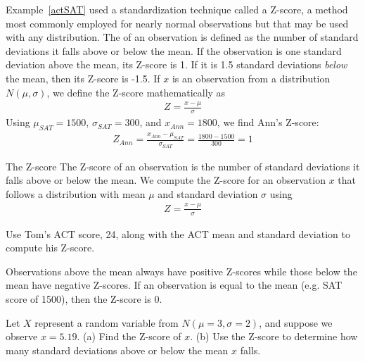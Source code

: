 Example~\ref{actSAT} used a standardization technique called a Z-score, a method most commonly employed for nearly normal observations but that may be used with any distribution. The  of an observation is defined as the number of standard deviations it falls above or below the mean. If the observation is one standard deviation above the mean, its Z-score is 1. If it is 1.5 standard deviations \emph{below} the mean, then its Z-score is -1.5. If $x$ is an observation from a distribution $N(\mu, \sigma)$, we define the Z-score mathematically as
\begin{eqnarray*}
Z = \frac{x-\mu}{\sigma}
\end{eqnarray*}
Using $\mu_{SAT}=1500$, $\sigma_{SAT}=300$, and $x_{Ann}=1800$, we find Ann's Z-score:
\begin{eqnarray*}
Z_{Ann} = \frac{x_{Ann} - \mu_{SAT}}{\sigma_{SAT}} = \frac{1800-1500}{300} = 1
\end{eqnarray*}

\begin{onebox}{The Z-score}
The Z-score of an observation is the number of standard deviations it falls above or below the mean. We compute the Z-score for an observation $x$ that follows a distribution with mean $\mu$ and standard deviation $\sigma$ using
\begin{eqnarray*}
Z = \frac{x-\mu}{\sigma}
\end{eqnarray*}
\end{onebox}

\begin{exercisewrap}
\begin{nexercise}
Use Tom's ACT score, 24, along with the ACT mean and standard deviation to compute his Z-score.\footnotemark
\end{nexercise}
\end{exercisewrap}

Observations above the mean always have positive Z-scores while those below the mean have negative Z-scores. If an observation is equal to the mean (e.g. SAT score of 1500), then the Z-score is $0$.

\begin{exercisewrap}
\begin{nexercise}
Let $X$ represent a random variable from $N(\mu=3, \sigma=2)$, and suppose we observe $x=5.19$. (a) Find the Z-score of $x$. (b) Use the Z-score to determine how many standard deviations above or below the mean $x$ falls.\footnotemark
\end{nexercise}
\end{exercisewrap}

